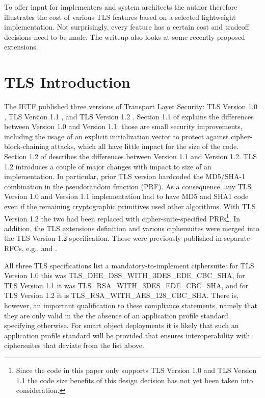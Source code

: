 \documentclass[a4paper, 10pt]{IEEEtran}
\begin{document}
To offer input for implementers and system architects the author therefore illustrates the cost of various TLS features based on a selected lightweight implementation. Not surprisingly, every feature has a certain cost and tradeoff decisions need to be made. The writeup also looks at some recently proposed extensions. 



\section{TLS Introduction}

The IETF published three versions of Transport Layer Security: TLS Version 1.0 \cite{rfc2246}, TLS Version 1.1 \cite{rfc4346}, and TLS Version 1.2 \cite{rfc5246}. Section 1.1 of  \cite{rfc4346} explains the differences between Version 1.0 and Version 1.1; those are small security improvements, including the usage of an explicit initialization vector to protect against cipher-block-chaining attacks, which all have little impact for the size of the code. Section 1.2 of \cite{rfc5246} describes the differences between Version 1.1 and Version 1.2. TLS 1.2 introduces a couple of major changes with impact to size of an implementation. In particular, prior TLS version hardcoded the MD5/SHA-1 combination in the pseudorandom function (PRF). As a consequence, any TLS Version 1.0 and Version 1.1 implementation had to have MD5 and SHA1 code even if the remaining cryptographic primitives used other algorithms. With TLS Version 1.2 the two had been replaced with cipher-suite-specified PRFs\footnote{Since the code in this paper only supports TLS Version 1.0 and TLS Version 1.1 the code size benefits of this design decision has not yet been taken into consideration.}. In addition, the TLS extensions definition and various ciphersuites were merged into the TLS Version 1.2 specification. Those were previously published in separate RFCs, e.g., \cite{rfc6066} and \cite{rfc3268}.

All three TLS specifications list a mandatory-to-implement ciphersuite: for TLS Version 1.0 this was TLS\_DHE\_DSS\_WITH\_3DES\_EDE\_CBC\_SHA, for TLS Version 1.1 it was TLS\_RSA\_WITH\_3DES\_EDE\_CBC\_SHA, and for TLS Version 1.2 it is TLS\_RSA\_WITH\_AES\_128\_CBC\_SHA. There is, however, an important qualification to these compliance statements, namely that they are only valid in the the absence of an application profile standard specifying otherwise. For smart object deployments it is likely that such an application profile standard will be provided that ensures interoperability with ciphersuites that deviate from the list above.  
\end{document}
